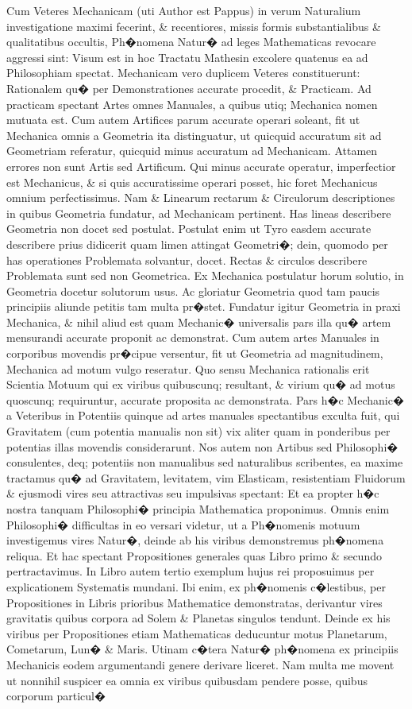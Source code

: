 \documentclass[twoside,12pt,draft]{sty/ucthesis-CA2012}
\begin{document}
\begin{mainmatter}
Cum Veteres Mechanicam (uti Author est Pappus) in verum Naturalium investigatione maximi fecerint, \& recentiores, missis formis substantialibus \& qualitatibus occultis, Ph�nomena Natur� ad leges Mathematicas revocare aggressi sint: Visum est in hoc Tractatu Mathesin excolere quatenus ea ad Philosophiam spectat. Mechanicam vero duplicem Veteres constituerunt: Rationalem qu� per Demonstrationes accurate procedit, \& Practicam. Ad practicam spectant Artes omnes Manuales, a quibus utiq; Mechanica nomen mutuata est. Cum autem Artifices parum accurate operari soleant, fit ut Mechanica omnis a Geometria ita distinguatur, ut quicquid accuratum sit ad Geometriam referatur, quicquid minus accuratum ad Mechanicam. Attamen errores non sunt Artis sed Artificum. Qui minus accurate operatur, imperfectior est Mechanicus, \& si quis accuratissime operari posset, hic foret Mechanicus omnium perfectissimus. Nam \& Linearum rectarum \& Circulorum descriptiones in quibus Geometria fundatur, ad Mechanicam pertinent. Has lineas describere Geometria non docet sed postulat. Postulat enim ut Tyro easdem accurate describere prius didicerit quam limen attingat Geometri�; dein, quomodo per has operationes Problemata solvantur, docet. Rectas \& circulos describere Problemata sunt sed non Geometrica. Ex Mechanica postulatur horum solutio, in Geometria docetur solutorum usus. Ac gloriatur Geometria quod tam paucis principiis aliunde petitis tam multa pr�stet. Fundatur igitur Geometria in praxi Mechanica, \& nihil aliud est quam Mechanic� universalis pars illa qu� artem mensurandi accurate proponit ac demonstrat. Cum autem artes Manuales in corporibus movendis pr�cipue versentur, fit ut Geometria ad magnitudinem, Mechanica ad motum vulgo reseratur. Quo sensu Mechanica rationalis erit Scientia Motuum qui ex viribus quibuscunq; resultant, \& virium qu� ad motus quoscunq; requiruntur, accurate proposita ac demonstrata. Pars h�c Mechanic� a Veteribus in Potentiis quinque ad artes manuales spectantibus exculta fuit, qui Gravitatem (cum potentia manualis non sit) vix aliter quam in ponderibus per potentias illas movendis considerarunt. Nos autem non Artibus sed Philosophi� consulentes, deq; potentiis non manualibus sed naturalibus scribentes, ea maxime tractamus qu� ad Gravitatem, levitatem, vim Elasticam, resistentiam Fluidorum \& ejusmodi vires seu attractivas seu impulsivas spectant: Et ea propter h�c nostra tanquam Philosophi� principia Mathematica proponimus. Omnis enim Philosophi� difficultas in eo versari videtur, ut a Ph�nomenis motuum investigemus vires Natur�, deinde ab his viribus demonstremus ph�nomena reliqua. Et hac spectant Propositiones generales quas Libro primo \& secundo pertractavimus. In Libro autem tertio exemplum hujus rei proposuimus per explicationem Systematis mundani. Ibi enim, ex ph�nomenis c�lestibus, per Propositiones in Libris prioribus Mathematice demonstratas, derivantur vires gravitatis quibus corpora ad Solem \& Planetas singulos tendunt. Deinde ex his viribus per Propositiones etiam Mathematicas deducuntur motus Planetarum, Cometarum, Lun� \& Maris. Utinam c�tera Natur� ph�nomena ex principiis Mechanicis eodem argumentandi genere derivare liceret. Nam multa me movent ut nonnihil suspicer ea omnia ex viribus quibusdam pendere posse, quibus corporum particul� 
\end{mainmatter}
\end{document}
